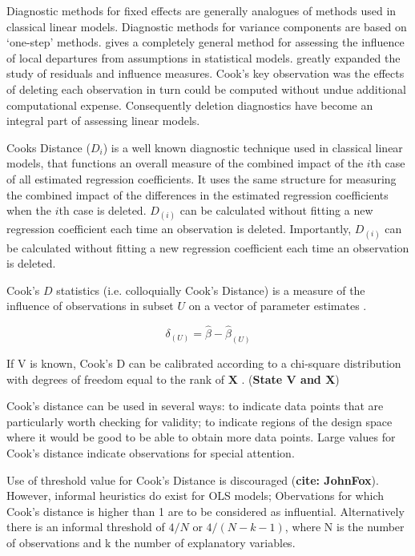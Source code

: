 \documentclass[12pt, a4paper]{report}
\theoremstyle{plain}
\theoremstyle{definition}
\theoremstyle{remark}
\begin{document}
Diagnostic methods for fixed effects are generally analogues of methods used in classical linear models.
Diagnostic methods for variance components are based on `one-step' methods. \citet{cook86} gives a completely general method for assessing the influence of local departures from assumptions in statistical models. \citet{cook77} greatly expanded the study of residuals and influence measures. Cook's key observation was the effects of deleting each observation in turn could be computed without undue additional computational expense. Consequently deletion diagnostics have become an integral part of assessing linear models.	


 Cooks Distance ($D_{i}$) is a well known diagnostic technique used in classical linear models, that functions an overall measure of the combined impact of the $i$th case of all estimated regression coefficients. It uses the same structure for measuring the combined impact of the differences in the estimated regression coefficients when the $i$th case is deleted. $D_{(i)}$ can be calculated without fitting a new regression coefficient each time an observation is deleted. Importantly, $D_{(i)}$ can be calculated without fitting a new regression coefficient each time an observation is deleted.

 Cook's $D$ statistics (i.e. colloquially Cook's Distance) is a measure of the influence of observations in subset $U$ on a vector of parameter estimates \citep{cook77}.

\[ \delta_{(U)} = \hat{\beta} - \hat{\beta}_{(U)}\]

If V is known, Cook's D can be calibrated according to a chi-square distribution with degrees of freedom equal to the rank of $\boldsymbol{X}$ \citep{cpj92}. (\textbf{State V and X})


Cook's distance can be used in several ways: to indicate data points that are particularly worth checking for validity; to indicate regions of the design space where it would be good to be able to obtain more data points. 
Large values for Cook's distance indicate observations for special attention. 

Use of threshold value for Cook's Distance is discouraged (\textbf{cite: JohnFox}). However, informal heuristics do exist for OLS models; Obervations for which Cook's distance is higher than 1 are to be considered as influential. Alternatively there is an informal threshold of $4/N$ or $4/(N−k−1)$, where N is the number of observations and k the number of explanatory variables.
\end{document}
